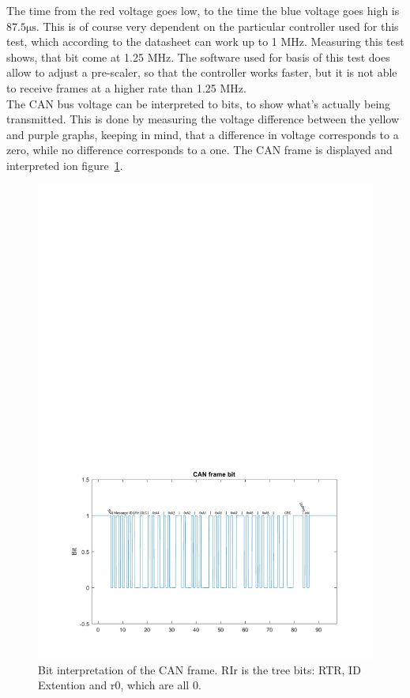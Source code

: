 The time from the red voltage goes low, to the time the blue voltage goes high is $87.5 \si{\micro\second}$.
This is of course very dependent on the particular controller used for this test, which according to the datasheet can work up to 1 MHz.
Measuring this test shows, that bit come at 1.25 MHz.
The software used for basis of this test does allow to adjust a pre-scaler, so that the controller works faster, but it is not able to receive frames at a higher rate than 1.25 MHz.\\

The CAN bus voltage can be interpreted to bits, to show what's actually being transmitted.
This is done by measuring the voltage difference between the yellow and purple graphs, keeping in mind, that a difference in voltage corresponds to a zero, while no difference corresponds to a one.
The CAN frame is displayed and interpreted ion figure~\ref{fig:CAN_test1_message}.\\

\begin{figure}[h]
	\centering
	\includegraphics[width = \linewidth]{graphics/CAN_test1_message}
	\caption[Bit interpretation of the CAN frame.]{Bit interpretation of the CAN frame. RIr  is the tree bits: RTR, ID Extention and r0, which are all 0.}
	\label{fig:CAN_test1_message}
\end{figure}

